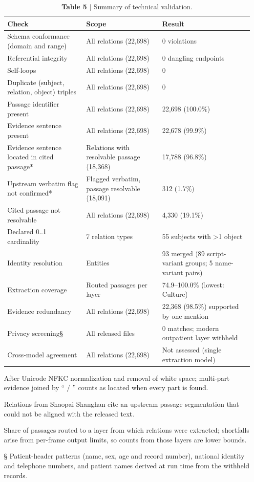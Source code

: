 \begin{table}[p]
\footnotesize
\begin{threeparttable}
\caption{\textbf{Table 5 $|$} Summary of technical validation.}
\begin{tabularx}{\linewidth}{XXX}
\toprule
Check & Scope & Result \\
\midrule
Schema conformance (domain and range) & All relations (22,698) & 0 violations \\
Referential integrity & All relations (22,698) & 0 dangling endpoints \\
Self-loops & All relations (22,698) & 0 \\
Duplicate (subject, relation, object) triples & All relations (22,698) & 0 \\
Passage identifier present & All relations (22,698) & 22,698 (100.0\%) \\
Evidence sentence present & All relations (22,698) & 22,678 (99.9\%) \\
Evidence sentence located in cited passage* & Relations with resolvable passage (18,368) & 17,788 (96.8\%) \\
Upstream verbatim flag not confirmed* & Flagged verbatim, passage resolvable (18,091) & 312 (1.7\%) \\
Cited passage not resolvable\textdagger{} & All relations (22,698) & 4,330 (19.1\%) \\
Declared 0..1 cardinality & 7 relation types & 55 subjects with >1 object \\
Identity resolution & Entities & 93 merged (89 script-variant groups; 5 name-variant pairs) \\
Extraction coverage\textdaggerdbl{} & Routed passages per layer & 74.9--100.0\% (lowest: Culture) \\
Evidence redundancy & All relations (22,698) & 22,368 (98.5\%) supported by one mention \\
Privacy screening\S{} & All released files & 0 matches; modern outpatient layer withheld \\
Cross-model agreement & All relations (22,698) & Not assessed (single extraction model) \\
\bottomrule
\end{tabularx}
\begin{tablenotes}\footnotesize
\item * After Unicode NFKC normalization and removal of white space; multi-part evidence joined by `` / '' counts as located when every part is found.
\item \textdagger{} Relations from Shaopai Shanghan cite an upstream passage segmentation that could not be aligned with the released text.
\item \textdaggerdbl{} Share of passages routed to a layer from which relations were extracted; shortfalls arise from per-frame output limits, so counts from those layers are lower bounds.
\item \S{} Patient-header patterns (name, sex, age and record number), national identity and telephone numbers, and patient names derived at run time from the withheld records.
\end{tablenotes}
\end{threeparttable}
\end{table}
